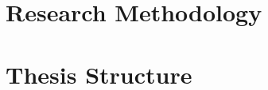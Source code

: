 \section{Research Methodology}
\label{introduction:research-methodology}







\section{Thesis Structure}
\label{introduction:thesis-structure}








%



